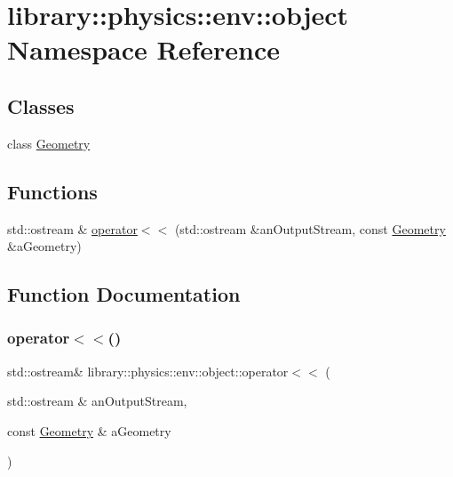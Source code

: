 \hypertarget{namespacelibrary_1_1physics_1_1env_1_1object}{}\section{library\+:\+:physics\+:\+:env\+:\+:object Namespace Reference}
\label{namespacelibrary_1_1physics_1_1env_1_1object}
\subsection*{Classes}
\begin{DoxyCompactItemize}
\item 
class \hyperlink{classlibrary_1_1physics_1_1env_1_1object_1_1_geometry}{Geometry}
\end{DoxyCompactItemize}
\subsection*{Functions}
\begin{DoxyCompactItemize}
\item 
std\+::ostream \& \hyperlink{namespacelibrary_1_1physics_1_1env_1_1object_a165109a96a386cf1ef3ca96e4b1694f4}{operator$<$$<$} (std\+::ostream \&an\+Output\+Stream, const \hyperlink{classlibrary_1_1physics_1_1env_1_1object_1_1_geometry}{Geometry} \&a\+Geometry)
\end{DoxyCompactItemize}


\subsection{Function Documentation}
\mbox{\label{namespacelibrary_1_1physics_1_1env_1_1object_a165109a96a386cf1ef3ca96e4b1694f4}} 
\subsubsection{\texorpdfstring{operator$<$$<$()}{operator<<()}}
{\footnotesize\ttfamily std\+::ostream\& library\+::physics\+::env\+::object\+::operator$<$$<$ (\begin{DoxyParamCaption}\item[{std\+::ostream \&}]{an\+Output\+Stream,  }\item[{const \hyperlink{classlibrary_1_1physics_1_1env_1_1object_1_1_geometry}{Geometry} \&}]{a\+Geometry }\end{DoxyParamCaption})}

